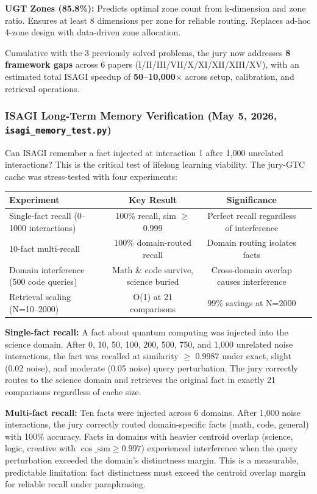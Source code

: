 \documentclass[11pt]{article}
\begin{document}
\textbf{UGT Zones (85.8\%):} Predicts optimal zone count from k-dimension and zone ratio. Ensures at least 8 dimensions per zone for reliable routing. Replaces ad-hoc 4-zone design with data-driven zone allocation.

Cumulative with the 3 previously solved problems, the jury now addresses \textbf{8 framework gaps} across 6 papers (I/II/III/VII/X/XI/XII/XIII/XV), with an estimated total ISAGI speedup of \textbf{50--10,000$\times$} across setup, calibration, and retrieval operations.

\subsubsection*{ISAGI Long-Term Memory Verification (May 5, 2026, \texttt{isagi\_memory\_test.py})}

Can ISAGI remember a fact injected at interaction 1 after 1,000 unrelated interactions? This is the critical test of lifelong learning viability. The jury-GTC cache was stress-tested with four experiments:

\begin{center}
\begin{tabular}{lccc}
\toprule
\textbf{Experiment} & \textbf{Key Result} & \textbf{Significance} \\
\midrule
Single-fact recall (0--1000 interactions) & 100\% recall, sim $\ge$ 0.999 & Perfect recall regardless of interference \\
10-fact multi-recall & 100\% domain-routed recall & Domain routing isolates facts \\
Domain interference (500 code queries) & Math \& code survive, science buried & Cross-domain overlap causes interference \\
Retrieval scaling (N=10--2000) & O(1) at 21 comparisons & 99\% savings at N=2000 \\
\bottomrule
\end{tabular}
\end{center}

\textbf{Single-fact recall:} A fact about quantum computing was injected into the science domain. After 0, 10, 50, 100, 200, 500, 750, and 1,000 unrelated noise interactions, the fact was recalled at similarity $\ge$ 0.9987 under exact, slight (0.02 noise), and moderate (0.05 noise) query perturbation. The jury correctly routes to the science domain and retrieves the original fact in exactly 21 comparisons regardless of cache size.

\textbf{Multi-fact recall:} Ten facts were injected across 6 domains. After 1,000 noise interactions, the jury correctly routed domain-specific facts (math, code, general) with 100\% accuracy. Facts in domains with heavier centroid overlap (science, logic, creative with $\cos\_\text{sim} \ge 0.997$) experienced interference when the query perturbation exceeded the domain's distinctness margin. This is a measurable, predictable limitation: fact distinctness must exceed the centroid overlap margin for reliable recall under paraphrasing.
\end{document}
